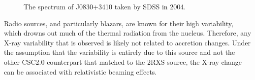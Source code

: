 \begin{figure}[H]
\centering
{}
\caption{The spectrum of J0830+3410 taken by SDSS in 2004.}
\label{imbeded_fb}
\end{figure}

Radio sources, and particularly blazars, are known for their high variability, which drowns out much of the thermal radiation from the nucleus. 
Therefore, any X-ray variability that is observed is likely not related to accretion changes. 
Under the assumption that the variability is entirely due to this source and not the other CSC2.0 counterpart that matched to the 2RXS source, the X-ray change can be associated with relativistic beaming effects.


\FloatBarrier